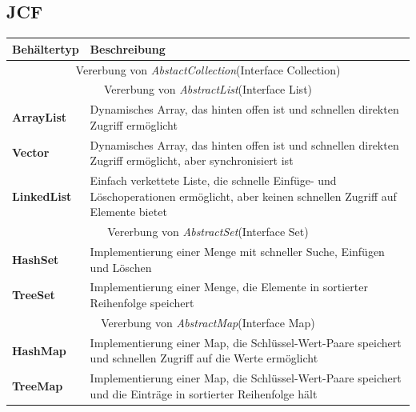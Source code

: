 \documentclass[12pt]{scrartcl}
\begin{document}
\subsection{JCF}
\begin{table}[H]
	\centering
	\begin{tabular}{ p{4cm} | p{11cm} }
		Behältertyp         & Beschreibung                                                                                                                       \\
		\hline
		\hline
		\multicolumn{2}{c}{Vererbung von \emph{AbstactCollection}(Interface Collection) }                                                                        \\
		\hline
		\multicolumn{2}{c}{Vererbung von \emph{AbstractList}(Interface List)}                                                                                    \\
		\hline
		\textbf{ArrayList}  & Dynamisches Array, das hinten offen ist und schnellen direkten Zugriff ermöglicht                                                  \\
		\hline
		\textbf{Vector}     & Dynamisches Array, das hinten offen ist und schnellen direkten Zugriff ermöglicht, aber synchronisiert ist                         \\
		\hline
		\textbf{LinkedList} & Einfach verkettete Liste, die schnelle Einfüge- und Löschoperationen ermöglicht, aber keinen schnellen Zugriff auf Elemente bietet \\
		\hline
		\multicolumn{2}{c}{Vererbung von \emph{AbstractSet}(Interface Set)}                                                                                      \\
		\hline
		\textbf{HashSet}    & Implementierung einer Menge mit schneller Suche, Einfügen und Löschen                                                              \\
		\hline
		\textbf{TreeSet}    & Implementierung einer Menge, die Elemente in sortierter Reihenfolge speichert                                                      \\
		\hline
		\hline
		\multicolumn{2}{c}{Vererbung von \emph{AbstractMap}(Interface Map)}                                                                                      \\
		\hline
		\textbf{HashMap}    & Implementierung einer Map, die Schlüssel-Wert-Paare speichert und schnellen Zugriff auf die Werte ermöglicht                       \\
		\hline
		\textbf{TreeMap}    & Implementierung einer Map, die Schlüssel-Wert-Paare speichert und die Einträge in sortierter Reihenfolge hält                      \\
	\end{tabular}
\end{table}
\end{document}
